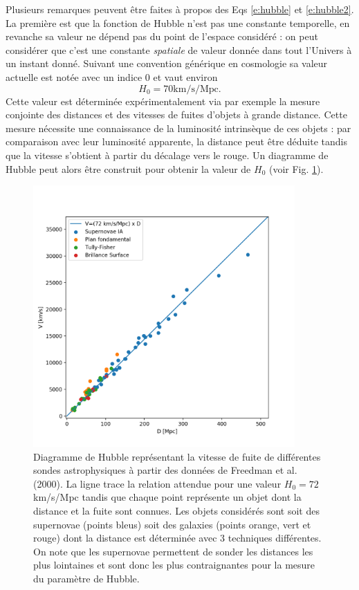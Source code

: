 Plusieurs remarques peuvent être faites à propos des Eqs \ref{e:hubble} et \ref{e:hubble2}.  La première est que la fonction de Hubble n'est pas une constante temporelle, en revanche sa valeur ne dépend pas du point de l'espace considéré : on peut considérer que c'est une constante \textit{spatiale} de valeur donnée dans tout l'Univers à un instant donné. Suivant une convention générique en cosmologie sa valeur actuelle est notée avec un indice 0 et vaut environ
\begin{equation}
H_0 = 70 \mathrm{km/s/Mpc}.
\end{equation}
Cette valeur est déterminée expérimentalement via par exemple la mesure conjointe des distances et des vitesses de fuites d'objets à grande distance. Cette mesure nécessite une connaissance de la luminosité intrinsèque de ces objets  : par comparaison avec leur luminosité apparente, la distance peut être déduite tandis que la vitesse s'obtient à partir du décalage vers le rouge. Un diagramme de Hubble peut alors être construit pour obtenir la valeur de $H_0$ (voir Fig. \ref{f:hubblediag}).
\begin{figure}[htbp]
	\centering
		\includegraphics[height=10cm]{figs/hubble.png}
	\caption[Diagramme de Hubble]{Diagramme de Hubble représentant la vitesse de fuite de différentes sondes astrophysiques à partir des données de Freedman et al. (2000). La ligne trace la relation attendue pour une valeur $H_0=72$ km/s/Mpc tandis que chaque point représente un objet dont la distance et la fuite sont connues. Les objets considérés sont soit des supernovae (points bleus) soit des galaxies (points orange, vert et rouge) dont la distance est déterminée avec 3 techniques différentes. On note que les supernovae permettent de sonder les distances les plus lointaines et sont donc les plus contraignantes pour la mesure du paramètre de Hubble. }
	\label{f:hubblediag}
\end{figure}

